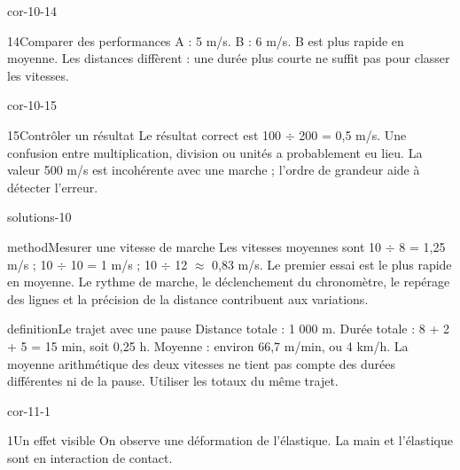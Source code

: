 \documentclass[12pt,twoside,openany]{book}
\begin{document}
\begin{blocLivre}{cor-10-14}
\begin{corrige}{14}{Comparer des performances}
A : 5 m/s. B : 6 m/s. B est plus rapide en moyenne. Les distances diffèrent : une durée plus courte ne suffit pas pour classer les vitesses.\par
\end{corrige}\end{blocLivre}
\begin{blocLivre}{cor-10-15}
\begin{corrige}{15}{Contrôler un résultat}
Le résultat correct est 100 \(\div\) 200 = 0,5 m/s. Une confusion entre multiplication, division ou unités a probablement eu lieu. La valeur 500 m/s est incohérente avec une marche ; l’ordre de grandeur aide à détecter l’erreur.\par
\end{corrige}\end{blocLivre}
\label{solutions-10}
\begin{pcFiche}{solutions-10}
\begin{pcEncadre}{method}{Mesurer une vitesse de marche}
Les vitesses moyennes sont 10 \(\div\) 8 = 1,25 m/s ; 10 \(\div\) 10 = 1 m/s ; 10 \(\div\) 12 \(\approx\) 0,83 m/s. Le premier essai est le plus rapide en moyenne. Le rythme de marche, le déclenchement du chronomètre, le repérage des lignes et la précision de la distance contribuent aux variations.\par
\end{pcEncadre}
\label{defi-cor-10}
\begin{pcEncadre}{definition}{Le trajet avec une pause}
Distance totale : 1 000 m. Durée totale : 8 + 2 + 5 = 15 min, soit 0,25 h. Moyenne : environ 66,7 m/min, ou 4 km/h. La moyenne arithmétique des deux vitesses ne tient pas compte des durées différentes ni de la pause. Utiliser les totaux du même trajet.\par
\end{pcEncadre}
\end{pcFiche}
\clearpage{}
\begin{blocLivre}{cor-11-1}
\begin{corrige}{1}{Un effet visible}
On observe une déformation de l’élastique. La main et l’élastique sont en interaction de contact.\par
\end{corrige}\end{blocLivre}
\end{document}
